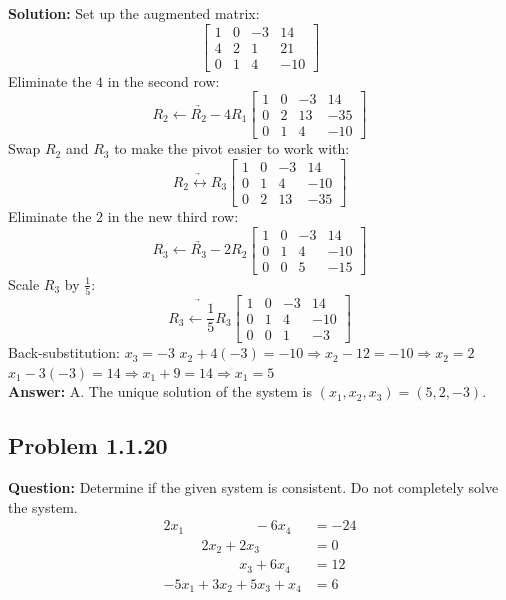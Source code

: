 \documentclass[11pt]{article}
\begin{document}
\textbf{Solution:}
Set up the augmented matrix:
\[
\begin{bmatrix}
1 & 0 & -3 & 14 \\
4 & 2 & 1 & 21 \\
0 & 1 & 4 & -10
\end{bmatrix}
\]
Eliminate the $4$ in the second row:
\[
\underrightarrow{R_2 \leftarrow R_2 - 4R_1}
\begin{bmatrix}
1 & 0 & -3 & 14 \\
0 & 2 & 13 & -35 \\
0 & 1 & 4 & -10
\end{bmatrix}
\]
Swap $R_2$ and $R_3$ to make the pivot easier to work with:
\[
\underrightarrow{R_2 \leftrightarrow R_3}
\begin{bmatrix}
1 & 0 & -3 & 14 \\
0 & 1 & 4 & -10 \\
0 & 2 & 13 & -35
\end{bmatrix}
\]
Eliminate the $2$ in the new third row:
\[
\underrightarrow{R_3 \leftarrow R_3 - 2R_2}
\begin{bmatrix}
1 & 0 & -3 & 14 \\
0 & 1 & 4 & -10 \\
0 & 0 & 5 & -15
\end{bmatrix}
\]
Scale $R_3$ by $\frac{1}{5}$:
\[
\underrightarrow{R_3 \leftarrow \frac{1}{5}R_3}
\begin{bmatrix}
1 & 0 & -3 & 14 \\
0 & 1 & 4 & -10 \\
0 & 0 & 1 & -3
\end{bmatrix}
\]
Back-substitution:
$x_3 = -3$
$x_2 + 4(-3) = -10 \Rightarrow x_2 - 12 = -10 \Rightarrow x_2 = 2$
$x_1 - 3(-3) = 14 \Rightarrow x_1 + 9 = 14 \Rightarrow x_1 = 5$
\\
\textbf{Answer:} A. The unique solution of the system is $(x_1, x_2, x_3) = (5, 2, -3)$.


\subsection*{Problem 1.1.20}
\textbf{Question:} Determine if the given system is consistent. Do not completely solve the system.
\begin{align*}
    2x_1 \phantom{+ 2x_2 + 2x_3} - 6x_4 &= -24 \\
    \phantom{2x_1 +} 2x_2 + 2x_3 \phantom{+ 6x_4} &= 0 \\
    \phantom{2x_1 + 2x_2 +} x_3 + 6x_4 &= 12 \\
    -5x_1 + 3x_2 + 5x_3 + x_4 &= 6
\end{align*}
\end{document}

